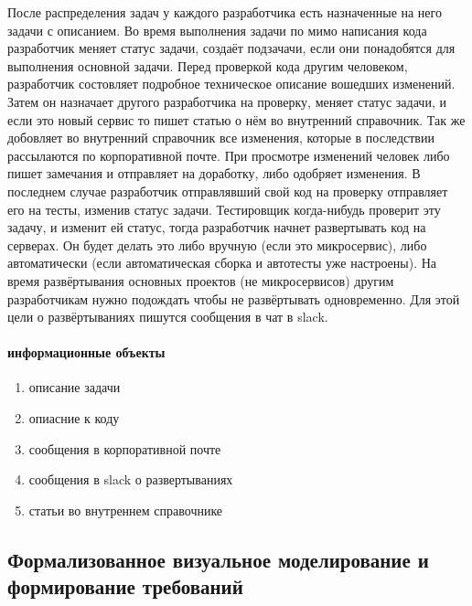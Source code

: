 \documentclass{article}
\begin{document}
После распределения задач у каждого разработчика есть назначенные на него задачи с описанием.
Во время выполнения задачи по мимо написания кода разработчик меняет статус задачи,
создаёт подзачачи, если они понадобятся для выполнения основной задачи.
Перед проверкой кода другим человеком, разработчик состовляет подробное техническое описание
вошедших изменений. Затем он назначает другого разработчика на проверку,
меняет статус задачи, и если это новый сервис то пишет статью о нём во внутренний справочник.
Так же добовляет во внутренний справочник все изменения,
которые в последствии рассылаются по корпоративной почте.
При просмотре изменений человек либо пишет замечания и отправляет на доработку,
либо одобряет изменения. В последнем случае разработчик отправлявший свой код на проверку
отправляет его на тесты, изменив статус задачи. Тестировщик когда-нибудь проверит эту задачу,
и изменит ей статус, тогда разработчик начнет развертывать код на серверах.
Он будет делать это либо вручную (если это микросервис), 
либо автоматически (если автоматическая сборка и автотесты уже настроены).
На время развёртывания основных проектов (не микросервисов) другим разработчикам нужно подождать
чтобы не развёртывать одновременно. Для этой цели о развёртываниях пишутся сообщения в чат в slack.

\paragraph{информационные объекты}
\begin{enumerate}
    \item{описание задачи}
    \item{опиасние к коду}
    \item{сообщения в корпоративной почте}
    \item{сообщения в slack о развертываниях}
    \item{статьи во внутреннем справочнике}
\end{enumerate}


\pagebreak


\subsection{Формализованное визуальное моделирование и формирование требований}
\end{document}
